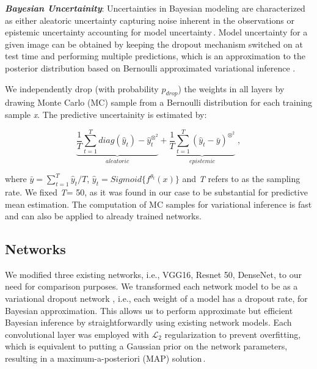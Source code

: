 \documentclass{article}
\begin{document}
\textit{\textbf{Bayesian Uncertainity}}: 
Uncertainties in Bayesian modeling are characterized as either aleatoric uncertainty 
capturing noise inherent in the observations or epistemic uncertainty accounting for 
model uncertainty\,\cite{gal2016dropout}. %
Model uncertainty for a given image can be obtained by keeping the dropout mechanism 
switched on at test time and performing multiple predictions, which is an approximation 
to the posterior distribution based on Bernoulli approximated variational inference
\cite{leibig2017leveraging, gal2016dropout}. 

We independently drop (with probability $p_{drop}$) the weights in all layers by drawing Monte Carlo 
(MC) sample from a Bernoulli distribution for each training sample \textit{x}.
The predictive uncertainity is estimated by:

\begin{equation}
    \displaystyle
    \underbrace{\frac{1}{T} \sum_{t=1}^T diag(\hat{y}_t)-\hat{y}_t^{\otimes^2}}_{\textit{aleatoric}} +
    \underbrace{\frac{1}{T} \sum_{t=1}^T (\hat{y}_t-\bar{y})^{\otimes^2}}_{\textit{epistemic}}\;,
\end{equation}

where $\bar{y}=\sum_{t=1}^T{\hat{y}_t}/{T}$, $\hat{y}_t=Sigmoid\{f^{\theta_{t}}(x)\}$ and
\textit{T} refers to as the sampling rate.
We fixed \textit{T}= 50, as it was found in our case to be substantial for predictive mean 
estimation. 
The computation of MC samples for variational inference is fast and can also be applied to 
already trained networks.

\subsection{Networks}
\label{subsec:app 1.1}
We modified three existing networks, i.e., VGG16, Resnet 50, DenseNet, to
our need for comparison purposes.
We transformed each network model to be as a variational dropout network 
\cite{kingma2015variational}, i.e., each weight of a model has a dropout rate,
for Bayesian approximation. 
This allows us to perform approximate but efficient Bayesian inference by 
straightforwardly using existing network models.
Each convolutional layer was employed with ${\mathcal{L}_{2}}$ regularization 
to prevent overfitting, which is equivalent to putting a Gaussian prior 
on the network parameters, resulting in a maximum-a-posteriori (MAP) 
solution\,\cite{leibig2017leveraging}.
\end{document}
